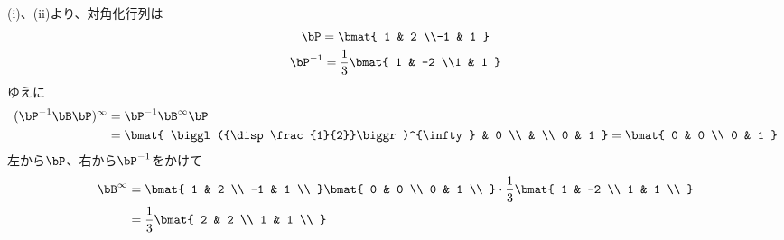 \begin{ans*}
\begin{enumerate}[label=(\arabic*)]
    (i)、(ii)より、対角化行列\bP は
    \begin{gather}
      \bP =
      \bmat{
        1 & 2 \\-1 & 1
      } \\
      \bP^{-1} = \frac{1}{3}
      \bmat{
        1 & -2 \\1 & 1
      }
    \end{gather}
    ゆえに
    \begin{align}
      (\bP^{-1}\bB\bP)^{\infty}
      &= \bP^{-1}\bB^{\infty}\bP\\
      &=
      \bmat{
        \biggl({\disp \frac{1}{2}}\biggr)^{\infty} & 0 \\ & \\ 0 & 1
      } =
      \bmat{
        0 & 0 \\ 0 & 1
      }
    \end{align}
    左から$\bP$、右から$\bP^{-1}$をかけて
    \begin{align}
      \bB^{\infty}
      &=
      \bmat{
        1 & 2 \\
        -1 & 1 \\
      }
      \bmat{
        0 & 0 \\
        0 & 1 \\
      }
      \cdot\frac{1}{3}
      \bmat{
        1 & -2 \\
        1 & 1 \\
      }\\
      &= \frac{1}{3}
      \bmat{
        2 & 2 \\
        1 & 1 \\
      }
    \end{align}
  \end{enumerate}
\end{ans*}
